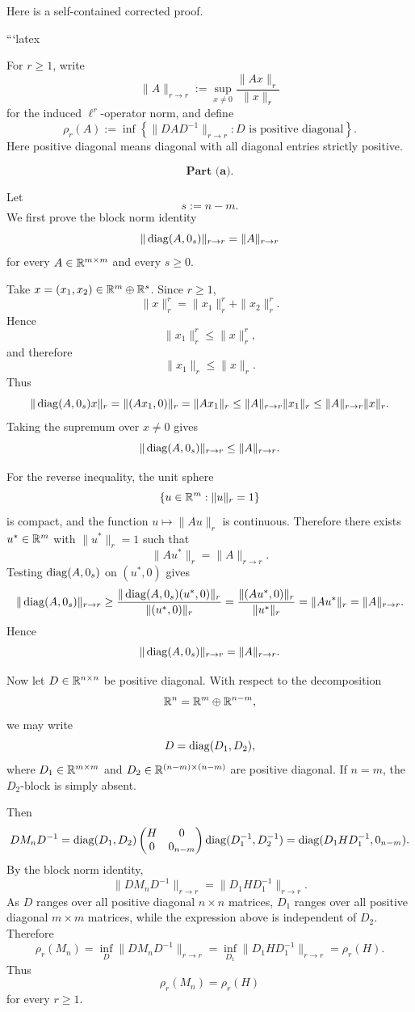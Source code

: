 Here is a self-contained corrected proof.

```latex
\[
\newcommand{\R}{\mathbb{R}}
\newcommand{\diag}{\operatorname{diag}}
\]

For \(r \geq 1\), write
\[
\|A\|_{r\to r}:=\sup_{x\neq 0}\frac{\|Ax\|_r}{\|x\|_r}
\]
for the induced \(\ell^r\)-operator norm, and define
\[
\rho_r(A):=\inf\left\{\|DAD^{-1}\|_{r\to r}: D \text{ is positive diagonal}\right\}.
\]
Here positive diagonal means diagonal with all diagonal entries strictly positive.

\[
\textbf{Part (a).}
\]

Let
\[
s:=n-m.
\]
We first prove the block norm identity
\[
\|\diag(A,0_s)\|_{r\to r}=\|A\|_{r\to r}
\]
for every \(A\in \R^{m\times m}\) and every \(s\geq 0\).

Take \(x=(x_1,x_2)\in \R^m\oplus \R^s\). Since \(r\geq 1\),
\[
\|x\|_r^r=\|x_1\|_r^r+\|x_2\|_r^r.
\]
Hence
\[
\|x_1\|_r^r\leq \|x\|_r^r,
\]
and therefore
\[
\|x_1\|_r\leq \|x\|_r.
\]
Thus
\[
\|\diag(A,0_s)x\|_r
=
\|(Ax_1,0)\|_r
=
\|Ax_1\|_r
\leq
\|A\|_{r\to r}\|x_1\|_r
\leq
\|A\|_{r\to r}\|x\|_r.
\]
Taking the supremum over \(x\neq 0\) gives
\[
\|\diag(A,0_s)\|_{r\to r}\leq \|A\|_{r\to r}.
\]

For the reverse inequality, the unit sphere
\[
\{u\in \R^m:\|u\|_r=1\}
\]
is compact, and the function \(u\mapsto \|Au\|_r\) is continuous. Therefore there exists \(u^\ast\in \R^m\) with \(\|u^\ast\|_r=1\) such that
\[
\|Au^\ast\|_r=\|A\|_{r\to r}.
\]
Testing \(\diag(A,0_s)\) on \((u^\ast,0)\) gives
\[
\|\diag(A,0_s)\|_{r\to r}
\geq
\frac{\|\diag(A,0_s)(u^\ast,0)\|_r}{\|(u^\ast,0)\|_r}
=
\frac{\|(Au^\ast,0)\|_r}{\|u^\ast\|_r}
=
\|Au^\ast\|_r
=
\|A\|_{r\to r}.
\]
Hence
\[
\|\diag(A,0_s)\|_{r\to r}=\|A\|_{r\to r}.
\]

Now let \(D\in \R^{n\times n}\) be positive diagonal. With respect to the decomposition
\[
\R^n=\R^m\oplus \R^{n-m},
\]
we may write
\[
D=\diag(D_1,D_2),
\]
where \(D_1\in \R^{m\times m}\) and \(D_2\in \R^{(n-m)\times (n-m)}\) are positive diagonal. If \(n=m\), the \(D_2\)-block is simply absent.

Then
\[
D M_n D^{-1}
=
\diag(D_1,D_2)
\begin{pmatrix}
H&0\\
0&0_{n-m}
\end{pmatrix}
\diag(D_1^{-1},D_2^{-1})
=
\diag(D_1HD_1^{-1},0_{n-m}).
\]
By the block norm identity,
\[
\|D M_n D^{-1}\|_{r\to r}
=
\|D_1HD_1^{-1}\|_{r\to r}.
\]
As \(D\) ranges over all positive diagonal \(n\times n\) matrices, \(D_1\) ranges over all positive diagonal \(m\times m\) matrices, while the expression above is independent of \(D_2\). Therefore
\[
\rho_r(M_n)
=
\inf_{D}\|D M_n D^{-1}\|_{r\to r}
=
\inf_{D_1}\|D_1HD_1^{-1}\|_{r\to r}
=
\rho_r(H).
\]
Thus
\[
\boxed{\rho_r(M_n)=\rho_r(H)}
\]
for every \(r\geq 1\).

